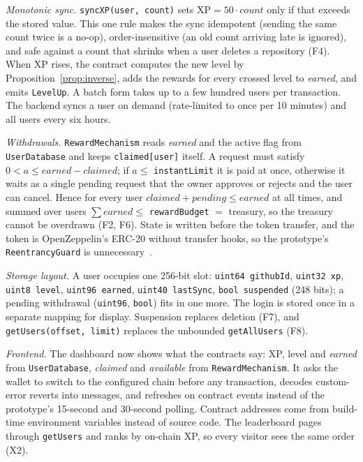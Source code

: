 \documentclass[conference]{IEEEtran}
\newcommand{\XP}{\mathrm{XP}}
\begin{document}
\textit{Monotonic sync.} \texttt{syncXP(user, count)} sets $\XP = 50 \cdot \mathit{count}$ only if that exceeds the stored value. This one rule makes the sync idempotent (sending the same count twice is a no-op), order-insensitive (an old count arriving late is ignored), and safe against a count that shrinks when a user deletes a repository (F4). When XP rises, the contract computes the new level by Proposition~\ref{prop:inverse}, adds the rewards for every crossed level to \emph{earned}, and emits \texttt{LevelUp}. A batch form takes up to a few hundred users per transaction. The backend syncs a user on demand (rate-limited to once per 10 minutes) and all users every six hours.

\textit{Withdrawals.} \texttt{RewardMechanism} reads \emph{earned} and the active flag from \texttt{UserDatabase} and keeps \texttt{claimed[user]} itself. A request must satisfy $0 < a \le \mathit{earned} - \mathit{claimed}$; if $a \le$ \texttt{instantLimit} it is paid at once, otherwise it waits as a single pending request that the owner approves or rejects and the user can cancel. Hence for every user $\mathit{claimed} + \mathit{pending} \le \mathit{earned}$ at all times, and summed over users $\sum \mathit{earned} \le$ \texttt{rewardBudget} $=$ treasury, so the treasury cannot be overdrawn (F2, F6). State is written before the token transfer, and the token is OpenZeppelin's ERC-20 without transfer hooks, so the prototype's \texttt{ReentrancyGuard} is unnecessary~\cite{atzei2017survey,luu2016smarter}.

\textit{Storage layout.} A user occupies one 256-bit slot: \texttt{uint64 githubId}, \texttt{uint32 xp}, \texttt{uint8 level}, \texttt{uint96 earned}, \texttt{uint40 lastSync}, \texttt{bool suspended} (248 bits); a pending withdrawal (\texttt{uint96}, \texttt{bool}) fits in one more. The login is stored once in a separate mapping for display. Suspension replaces deletion (F7), and \texttt{getUsers(offset, limit)} replaces the unbounded \texttt{getAllUsers} (F8).

\textit{Frontend.} The dashboard now shows what the contracts say: XP, level and \emph{earned} from \texttt{UserDatabase}, \emph{claimed} and \emph{available} from \texttt{RewardMechanism}. It asks the wallet to switch to the configured chain before any transaction, decodes custom-error reverts into messages, and refreshes on contract events instead of the prototype's 15-second and 30-second polling. Contract addresses come from build-time environment variables instead of source code. The leaderboard pages through \texttt{getUsers} and ranks by on-chain XP, so every visitor sees the same order (X2).
\end{document}
